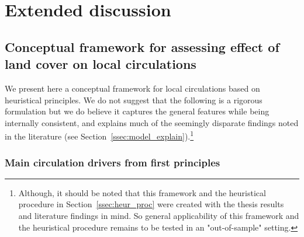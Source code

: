 \chapter{Extended discussion}
\label{ch:discussion}

\section[Framework to assess land cover effect on circulations]{Conceptual framework for assessing effect of land cover on local circulations}

We present here a conceptual framework for local circulations based on heuristical principles. We do not suggest that the following is a rigorous formulation but we do believe it captures the general features while being internally consistent, and explains much of the seemingly disparate findings noted in the literature (see Section~\ref{ssec:model_explain}).\footnote{Although, it should be noted that this framework and the heuristical procedure in Section~\ref{ssec:heur_proc} were created with the thesis results and literature findings in mind. So general applicability of this framework and the heuristical procedure remains to be tested in an "out-of-sample" setting.}

\subsection{Main circulation drivers from first principles}

